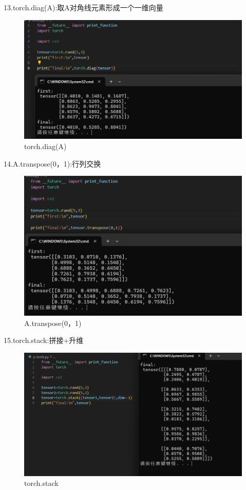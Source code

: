 \documentclass[a4paper, 12pt]{article}
\begin{document}
 13.torch.diag(A):取A对角线元素形成一个一维向量
\begin{figure}[H]
  \centering
  \includegraphics[width=\textwidth]{屏幕截图 2024-09-15 110200.png}
  \caption{torch.diag(A)}
\end{figure}

14.A.transpose(0，1):行列交换
\begin{figure}[H]
  \centering
  \includegraphics[width=\textwidth]{屏幕截图 2024-09-15 110337.png}
  \caption{A.transpose(0，1)}
\end{figure}

 15.torch.stack:拼接+升维
\begin{figure}[H]
  \centering
  \includegraphics[width=\textwidth]{屏幕截图 2024-09-15 110619.png}
  \caption{torch.stack}
\end{figure}
\end{document}
